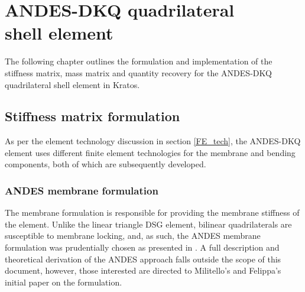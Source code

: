 




\setcounter{MaxMatrixCols}{20}

\chapter[ANDES-DKQ quadrilateral shell element]{ANDES-DKQ quadrilateral \\ shell element}
\renewcommand{\Thema}{ANDES-DKT quadrilateral shell element}

The following chapter outlines the formulation and implementation of the stiffness matrix, mass matrix and quantity recovery for the ANDES-DKQ quadrilateral shell element in Kratos.

\section{Stiffness matrix formulation}

As per the element technology discussion in section \ref{FE_tech}, the ANDES-DKQ element uses different finite element technologies for the membrane and bending components, both of which are subsequently developed. 

\subsection{ANDES membrane formulation}

The membrane formulation is responsible for providing the membrane stiffness of the element. Unlike the linear triangle DSG element, bilinear quadrilaterals are susceptible to membrane locking, and, as such, the ANDES membrane formulation was prudentially chosen as presented in \cite{Hau94}. A full description and theoretical derivation of the ANDES approach falls outside the scope of this document, however, those interested are directed to Militello's and Felippa's initial paper \cite{Fel91} on the formulation.

